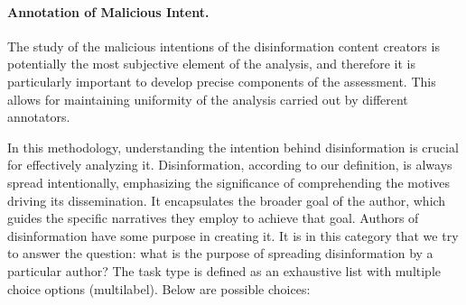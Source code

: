 \documentclass[11pt]{article}
\begin{document}
\paragraph{Annotation of Malicious Intent.} The study of the malicious intentions of the disinformation content creators is potentially the most subjective element of the analysis, and therefore it is particularly important to develop precise components of the assessment. This allows for maintaining uniformity of the analysis carried out by different annotators.


In this methodology, understanding the intention behind disinformation is crucial for effectively analyzing it. Disinformation, according to our definition, is always spread intentionally, emphasizing the significance of comprehending the motives driving its dissemination. It encapsulates the broader goal of the author, which guides the specific narratives they employ to achieve that goal. Authors of disinformation have some purpose in creating it. It is in this category that we try to answer the question: what is the purpose of spreading disinformation by a particular author? The task type is defined as an exhaustive list with multiple choice options (multilabel). Below are possible choices:
\end{document}
